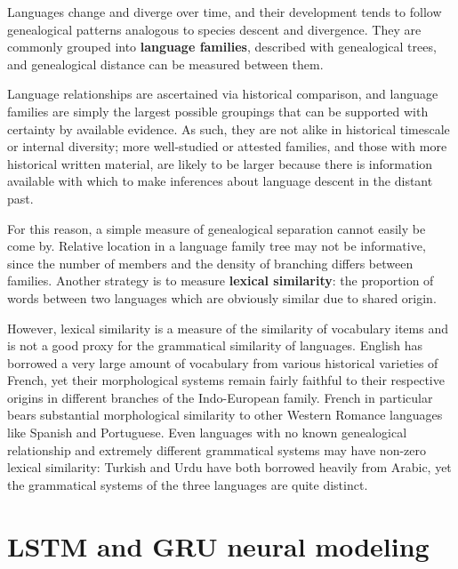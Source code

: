 Languages change and diverge over time, and their development tends to follow genealogical patterns analogous to species descent and divergence. They are commonly grouped into \textbf{language families}, described with genealogical trees, and genealogical distance can be measured between them.

Language relationships are ascertained via historical comparison, and language families are simply the largest possible groupings that can be supported with certainty by available evidence. As such, they are not alike in historical timescale or internal diversity; more well-studied or attested families, and those with more historical written material, are likely to be larger because there is information available with which to make inferences about language descent in the distant past.

For this reason, a simple measure of genealogical separation cannot easily be come by. Relative location in a language family tree may not be informative, since the number of members and the density of branching differs between families. Another strategy is to measure \textbf{lexical similarity}: the proportion of words between two languages which are obviously similar due to shared origin.

However, lexical similarity is a measure of the similarity of vocabulary items and is not a good proxy for the grammatical similarity of languages. English has borrowed a very large amount of vocabulary from various historical varieties of French, yet their morphological systems remain fairly faithful to their respective origins in different branches of the Indo-European family. French in particular bears substantial morphological similarity to other Western Romance languages like Spanish and Portuguese. Even languages with no known genealogical relationship and extremely different grammatical systems may have non-zero lexical similarity: Turkish and Urdu have both borrowed heavily from Arabic, yet the grammatical systems of the three languages are quite distinct.

\section{LSTM and GRU neural modeling}
\label{sec:LSTM}

